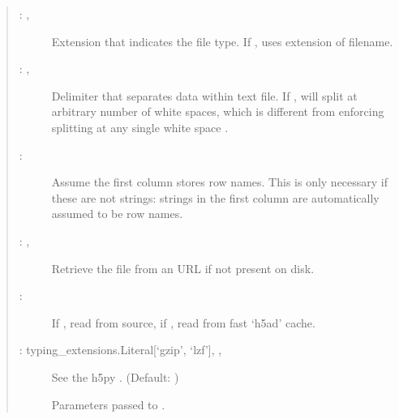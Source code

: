 \documentclass[letterpaper,10pt,english]{sphinxmanual}
\begin{document}
\begin{fulllineitems}
\begin{quote}
\begin{description}
\begin{description}
\item[{ : , }] \leavevmode
Extension that indicates the file type. If , uses extension of
filename.

\item[{ : , }] \leavevmode
Delimiter that separates data within text file. If , will split at
arbitrary number of white spaces, which is different from enforcing
splitting at any single white space \sphinxcode{\sphinxupquote{\textquotesingle{} \textquotesingle{}}}.

\item[{ : }] \leavevmode
Assume the first column stores row names. This is only necessary if
these are not strings: strings in the first column are automatically
assumed to be row names.

\item[{ : , }] \leavevmode
Retrieve the file from an URL if not present on disk.

\item[{ : }] \leavevmode
If , read from source, if , read from fast ‘h5ad’ cache.

\item[{ : typing\_extensions.Literal{[}‘gzip’, ‘lzf’{]}, , }] \leavevmode
See the h5py .
(Default: )

\item[{}] \leavevmode
Parameters passed to .


\end{description}
\end{description}
\end{quote}
\end{fulllineitems}
\end{document}
